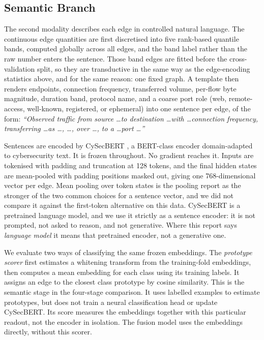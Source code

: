 \subsection{Semantic Branch}

The second modality describes each edge in controlled natural language. The continuous edge
quantities are first discretised into five rank-based quantile bands, computed globally across
all edges, and the band label rather than the raw number enters the sentence. Those band edges
are fitted before the cross-validation split, so they are transductive in the same way as the
edge-encoding statistics above, and for the same reason: one fixed graph. A template then
renders endpoints, connection frequency, transferred volume, per-flow byte magnitude,
duration band, protocol name, and a coarse port role (web, remote-access, well-known,
registered, or ephemeral) into one sentence per edge, of the form: \emph{``Observed traffic
from source \dots to destination \dots with \dots connection frequency, transferring \dots as
\dots, \dots, over \dots, to a \dots port \dots''}

Sentences are encoded by CySecBERT \citep{bayer2024cysecbert}, a BERT-class encoder
\citep{devlin2019bert} domain-adapted to cybersecurity text. It is frozen throughout. No gradient reaches it. Inputs
are tokenised with padding and truncation at 128 tokens, and the final hidden states are
mean-pooled with padding positions masked out, giving one 768-dimensional vector per edge.
Mean pooling over token states is the pooling \citet{reimers2019sbert} report as the
stronger of the two common choices for a sentence vector, and we did not compare it against
the first-token alternative on this data.
CySecBERT is a pretrained language model, and we use it strictly as a sentence encoder: it is
not prompted, not asked to reason, and not generative. Where this report says \emph{language
model} it means that pretrained encoder, not a generative one.

We evaluate two ways of classifying the same frozen embeddings. The \emph{prototype scorer} first estimates a whitening transform from the training-fold embeddings, then computes a mean embedding for each class using its training labels. It assigns an edge to the closest class prototype by cosine similarity. This is the semantic stage in the four-stage comparison. It uses labelled examples to estimate prototypes, but does not train a neural classification head or update CySecBERT. Its score measures the embeddings together with this particular readout, not the encoder in isolation. The fusion model uses the embeddings directly, without this scorer.

